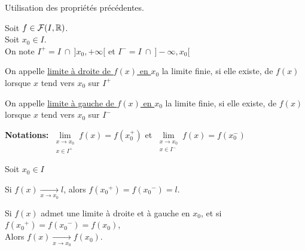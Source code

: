 \documentclass[12pt,twoside,a4paper]{article}
\begin{document}
		\begin{preuve}
			Utilisation des propri\'et\'es pr\'ec\'edentes.
		\end{preuve}
		\begin{defi}
			Soit $f\in\mathcal{F}(I,\mathbb{R})$.\\
			Soit $x_0\in I$.\\
			On note $I^{+}=I\ \cap\  ]x_0,+\infty[$ et $I^{-}=I\ \cap\  ]-\infty,x_0[$
			\begin{liste}
				\item On appelle \underline{limite \`a droite de $f(x)$ en $x_0$} la limite finie, si elle existe, de $f(x)$ lorsque $x$ tend vers $x_0$ sur $I^{+}$
				\item On appelle \underline{limite \`a gauche de $f(x)$ en $x_0$} la limite finie, si elle existe, de $f(x)$ lorsque $x$ tend vers $x_0$ sur $I^{-}$
			\end{liste}
		\end{defi}
		\begin{flushleft}
			\textbf{Notations:} $\lim\limits_{\substack{x\rightarrow x_0\\x\in I^{+}}} f(x) = f(x_0^{+})$ et $\lim\limits_{\substack{x\rightarrow x_0\\x\in I^{-}}} f(x) = f(x_0^{-})$
		\end{flushleft}
		\begin{prop}
			Soit $x_0\in I$
			\begin{liste}
				\item Si $f(x) \mathop{\longrightarrow}\limits_{x\rightarrow x_0} l$, alors $f({x_0}^{+})=f({x_0}^{-})=l$.
				\item Si $f(x)$ admet une limite \`a droite et \`a gauche en $x_0$, et si $f({x_0}^{+})=f({x_0}^{-})=f(x_0)$,\\
				Alors $f(x) \mathop{\longrightarrow}\limits_{x\rightarrow x_0} f(x_0)$.
			\end{liste}
		\end{prop}
\end{document}
